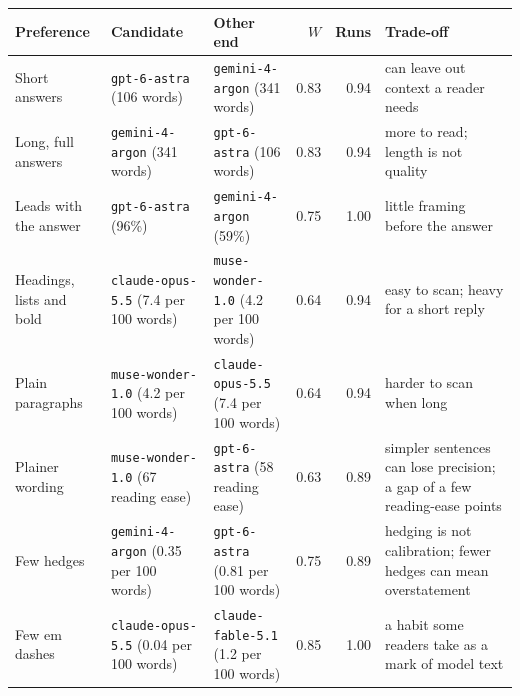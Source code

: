 \begin{tabular}{>{\raggedright\arraybackslash}p{3.0cm}llrr>{\raggedright\arraybackslash}p{4.4cm}}
\toprule
Preference & Candidate & Other end & $W$ & Runs & Trade-off \\
\midrule
Short answers & \texttt{gpt-6-astra} (106 words) & \texttt{gemini-4-argon} (341 words) & 0.83 & 0.94 & can leave out context a reader needs \\
Long, full answers & \texttt{gemini-4-argon} (341 words) & \texttt{gpt-6-astra} (106 words) & 0.83 & 0.94 & more to read; length is not quality \\
Leads with the answer & \texttt{gpt-6-astra} (96\%) & \texttt{gemini-4-argon} (59\%) & 0.75 & 1.00 & little framing before the answer \\
Headings, lists and bold & \texttt{claude-opus-5.5} (7.4 per 100 words) & \texttt{muse-wonder-1.0} (4.2 per 100 words) & 0.64 & 0.94 & easy to scan; heavy for a short reply \\
Plain paragraphs & \texttt{muse-wonder-1.0} (4.2 per 100 words) & \texttt{claude-opus-5.5} (7.4 per 100 words) & 0.64 & 0.94 & harder to scan when long \\
Plainer wording & \texttt{muse-wonder-1.0} (67 reading ease) & \texttt{gpt-6-astra} (58 reading ease) & 0.63 & 0.89 & simpler sentences can lose precision; a gap of a few reading-ease points \\
Few hedges & \texttt{gemini-4-argon} (0.35 per 100 words) & \texttt{gpt-6-astra} (0.81 per 100 words) & 0.75 & 0.89 & hedging is not calibration; fewer hedges can mean overstatement \\
Few em dashes & \texttt{claude-opus-5.5} (0.04 per 100 words) & \texttt{claude-fable-5.1} (1.2 per 100 words) & 0.85 & 1.00 & a habit some readers take as a mark of model text \\
\bottomrule
\end{tabular}
